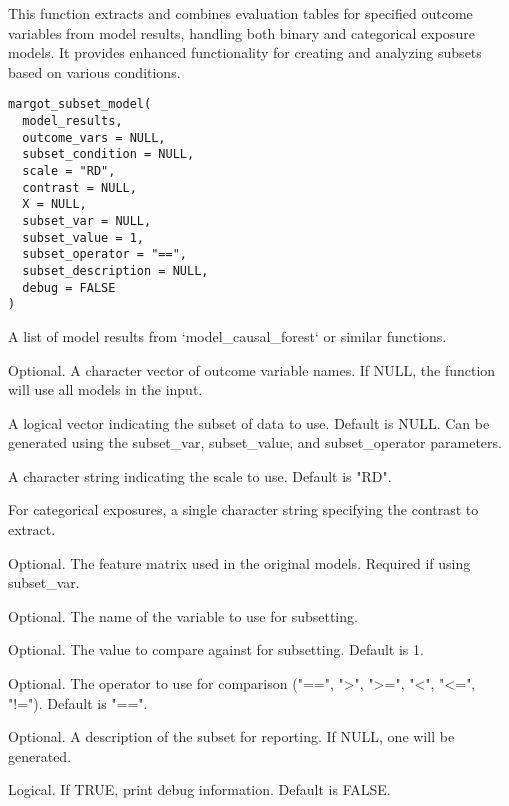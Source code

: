 \documentclass[a4paper]{book}
\begin{document}
%
\begin{Description}
This function extracts and combines evaluation tables for specified outcome variables
from model results, handling both binary and categorical exposure models. It provides
enhanced functionality for creating and analyzing subsets based on various conditions.
\end{Description}
%
\begin{Usage}
\begin{verbatim}
margot_subset_model(
  model_results,
  outcome_vars = NULL,
  subset_condition = NULL,
  scale = "RD",
  contrast = NULL,
  X = NULL,
  subset_var = NULL,
  subset_value = 1,
  subset_operator = "==",
  subset_description = NULL,
  debug = FALSE
)
\end{verbatim}
\end{Usage}
%
\begin{Arguments}
\begin{ldescription}
\item[\code{model\_results}] A list of model results from `model\_causal\_forest` or similar functions.

\item[\code{outcome\_vars}] Optional. A character vector of outcome variable names. If NULL,
the function will use all models in the input.

\item[\code{subset\_condition}] A logical vector indicating the subset of data to use. Default is NULL.
Can be generated using the subset\_var, subset\_value, and subset\_operator parameters.

\item[\code{scale}] A character string indicating the scale to use. Default is "RD".

\item[\code{contrast}] For categorical exposures, a single character string specifying the contrast to extract.

\item[\code{X}] Optional. The feature matrix used in the original models. Required if using subset\_var.

\item[\code{subset\_var}] Optional. The name of the variable to use for subsetting.

\item[\code{subset\_value}] Optional. The value to compare against for subsetting. Default is 1.

\item[\code{subset\_operator}] Optional. The operator to use for comparison ("==", ">", ">=", "<", "<=", "!="). Default is "==".

\item[\code{subset\_description}] Optional. A description of the subset for reporting. If NULL, one will be generated.

\item[\code{debug}] Logical. If TRUE, print debug information. Default is FALSE.
\end{ldescription}
\end{Arguments}
\end{document}
